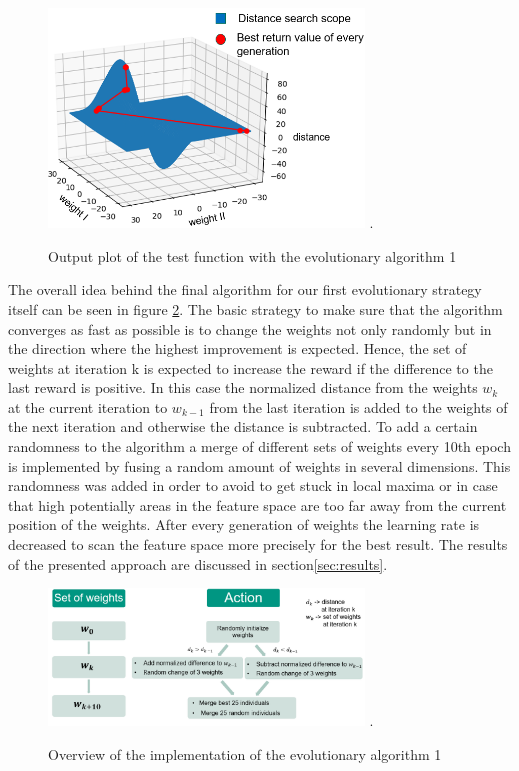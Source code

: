 \begin{figure}[H]
	\centering
	\includegraphics[width=3.3in]{img/test_function.png}
	\DeclareGraphicsExtensions.
	\caption{Output plot of the test function with the evolutionary algorithm 1}
	\label{fig:test_function}
\end{figure}

The overall idea behind the final algorithm for our first evolutionary strategy itself can be seen in figure \ref{fig:evo_strat_1}. The basic strategy to make sure that the algorithm converges as fast as possible is to change the weights not only randomly but in the direction where the highest improvement is expected. Hence, the set of weights at iteration k is expected to increase the reward if the difference to the last reward is positive. In this case the normalized distance from the weights $w_k$  at the current iteration to $w_{k-1}$ from the last iteration is added to the weights of the next iteration and otherwise the distance is subtracted. To add a certain randomness to the algorithm a merge of different sets of weights every 10th epoch is implemented by fusing a random amount of weights in several dimensions. This randomness was added in order to avoid to get stuck in local maxima or in case that high potentially areas in the feature space are too far away from the current position of the weights. After every generation of weights the learning rate is decreased to scan the feature space more precisely for the best result. 
The results of the presented approach are discussed in section\ref{sec:results}.

\begin{figure}[H]
	\centering
	\includegraphics[width=3.3in]{img/evo_strat_1.png}
	\DeclareGraphicsExtensions.
	\caption{Overview of the implementation of the evolutionary algorithm 1}
	\label{fig:evo_strat_1}
\end{figure}

